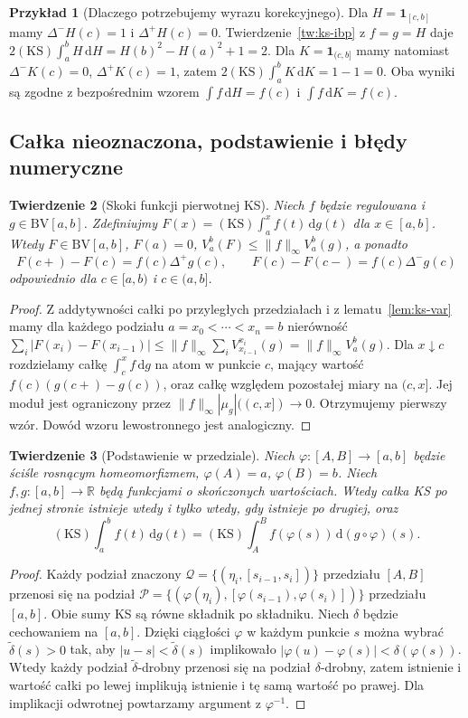 \documentclass[11pt,a4paper]{article}
\numberwithin{equation}{section}
\theoremstyle{plain}
\newtheorem{twierdzenie}{Twierdzenie}[section]
\theoremstyle{definition}
\newtheorem{przyklad}[twierdzenie]{Przykład}
\theoremstyle{remark}
\newcommand{\R}{\mathbb R}
\newcommand{\ind}[1]{\mathbf 1_{#1}}
\newcommand{\BV}{\mathrm{BV}}
\newcommand{\KS}{\mathrm{KS}}
\begin{document}
\begin{przyklad}[Dlaczego potrzebujemy wyrazu korekcyjnego]
Dla $H=\ind{[c,b]}$ mamy $\Delta^-H(c)=1$ i $\Delta^+H(c)=0$. Twierdzenie~\ref{tw:ks-ibp} z $f=g=H$ daje
$2(\KS)\int_a^b H\,\mathrm dH=H(b)^2-H(a)^2+1=2$. Dla $K=\ind{(c,b]}$ mamy natomiast $\Delta^-K(c)=0$, $\Delta^+K(c)=1$, zatem $2(\KS)\int_a^b K\,\mathrm dK=1-1=0$. Oba wyniki są zgodne z bezpośrednim wzorem $\int f\,\mathrm dH=f(c)$ i $\int f\,\mathrm dK=f(c)$.
\end{przyklad}

\subsection*{Całka nieoznaczona, podstawienie i błędy numeryczne}
\begin{twierdzenie}[Skoki funkcji pierwotnej KS]
\label{tw:ks-primitive}
Niech $f$ będzie regulowana i $g\in\BV[a,b]$. Zdefiniujmy $F(x)=(\KS)\int_a^x f(t)\,\mathrm dg(t)$ dla $x\in[a,b]$. Wtedy $F\in\BV[a,b]$, $F(a)=0$, $V_a^b(F)\le\|f\|_\infty V_a^b(g)$, a ponadto
\[
 F(c+)-F(c)=f(c)\Delta^+g(c),\qquad
 F(c)-F(c-)=f(c)\Delta^-g(c)
\]
odpowiednio dla $c\in[a,b)$ i $c\in(a,b]$.
\end{twierdzenie}
\begin{proof}
Z addytywności całki po przyległych przedziałach i z lematu~\ref{lem:ks-var} mamy dla każdego podziału $a=x_0<\cdots<x_n=b$ nierówność $\sum_i|F(x_i)-F(x_{i-1})|\le\|f\|_\infty\sum_i V_{x_{i-1}}^{x_i}(g)=\|f\|_\infty V_a^b(g)$. Dla $x\downarrow c$ rozdzielamy całkę $\int_c^x f\,\mathrm dg$ na atom w punkcie $c$, mający wartość $f(c)(g(c+)-g(c))$, oraz całkę względem pozostałej miary na $(c,x]$. Jej moduł jest ograniczony przez $\|f\|_\infty|\mu_g|((c,x])\to0$. Otrzymujemy pierwszy wzór. Dowód wzoru lewostronnego jest analogiczny.
\end{proof}

\begin{twierdzenie}[Podstawienie w przedziale]
\label{tw:ks-substitution}
Niech $\varphi:[A,B]\to[a,b]$ będzie ściśle rosnącym homeomorfizmem, $\varphi(A)=a$, $\varphi(B)=b$. Niech $f,g:[a,b]\to\R$ będą funkcjami o skończonych wartościach. Wtedy całka KS po jednej stronie istnieje wtedy i tylko wtedy, gdy istnieje po drugiej, oraz
\[
 (\KS)\int_a^b f(t)\,\mathrm dg(t)
 =(\KS)\int_A^B f(\varphi(s))\,\mathrm d(g\circ\varphi)(s).
\]
\end{twierdzenie}
\begin{proof}
Każdy podział znaczony $\mathcal Q=\{(\eta_i,[s_{i-1},s_i])\}$ przedziału $[A,B]$ przenosi się na podział $\mathcal P=\{(\varphi(\eta_i),[\varphi(s_{i-1}),\varphi(s_i)])\}$ przedziału $[a,b]$. Obie sumy KS są równe składnik po składniku. Niech $\delta$ będzie cechowaniem na $[a,b]$. Dzięki ciągłości $\varphi$ w każdym punkcie $s$ można wybrać $\widetilde\delta(s)>0$ tak, aby $|u-s|<\widetilde\delta(s)$ implikowało $|\varphi(u)-\varphi(s)|<\delta(\varphi(s))$. Wtedy każdy podział $\widetilde\delta$-drobny przenosi się na podział $\delta$-drobny, zatem istnienie i wartość całki po lewej implikują istnienie i tę samą wartość po prawej. Dla implikacji odwrotnej powtarzamy argument z $\varphi^{-1}$.
\end{proof}
\end{document}
